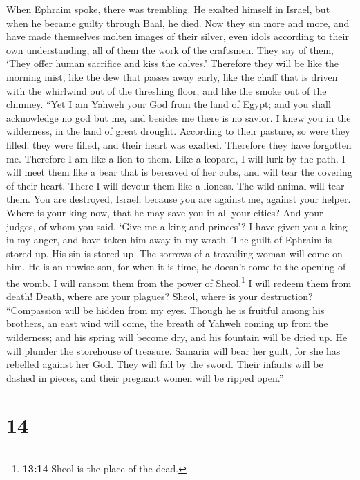  When Ephraim spoke, there was trembling. He exalted
himself in Israel, but when he became guilty through Baal, he died.
 Now they sin more and more, and have made themselves
molten images of their silver, even idols according to their own
understanding, all of them the work of the craftsmen. They say of them,
`They offer human sacrifice and kiss the calves.' 
Therefore they will be like the morning mist, like the dew that passes
away early, like the chaff that is driven with the whirlwind out of the
threshing floor, and like the smoke out of the chimney. 
``Yet I am Yahweh your God from the land of Egypt; and you shall
acknowledge no god but me, and besides me there is no savior.
 I knew you in the wilderness, in the land of great
drought.  According to their pasture, so were they filled;
they were filled, and their heart was exalted. Therefore they have
forgotten me.  Therefore I am like a lion to them. Like a
leopard, I will lurk by the path.  I will meet them like a
bear that is bereaved of her cubs, and will tear the covering of their
heart. There I will devour them like a lioness. The wild animal will
tear them.  You are destroyed, Israel, because you are
against me, against your helper.  Where is your king now,
that he may save you in all your cities? And your judges, of whom you
said, `Give me a king and princes'?  I have given you a
king in my anger, and have taken him away in my wrath. 
The guilt of Ephraim is stored up. His sin is stored up. 
The sorrows of a travailing woman will come on him. He is an unwise son,
for when it is time, he doesn't come to the opening of the womb.
 I will ransom them from the power of Sheol.\footnote{\textbf{13:14}
  Sheol is the place of the dead.} I will redeem them from death! Death,
where are your plagues? Sheol, where is your destruction? ``Compassion
will be hidden from my eyes.  Though he is fruitful among
his brothers, an east wind will come, the breath of Yahweh coming up
from the wilderness; and his spring will become dry, and his fountain
will be dried up. He will plunder the storehouse of treasure.
 Samaria will bear her guilt, for she has rebelled
against her God. They will fall by the sword. Their infants will be
dashed in pieces, and their pregnant women will be ripped open.''

\hypertarget{section-8}{%
\section{14}\label{section-8}}

